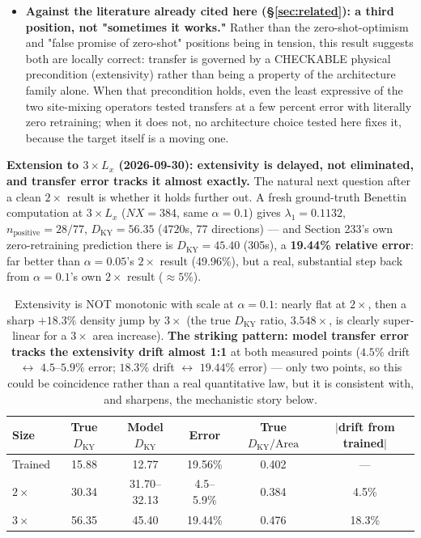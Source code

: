 \documentclass[11pt]{article}
\begin{document}
\begin{itemize}[nosep]
structure) but consistent with the classic flexibility/generalization
trade-off, here measured specifically along the domain-size-extrapolation
axis this document's whole architecture family is built around.
\item \textbf{Against the literature already cited here
(\S\ref{sec:related}): a third position, not "sometimes it works."}
Rather than the zero-shot-optimism and "false promise of zero-shot"
positions being in tension, this result suggests both are locally
correct: transfer is governed by a CHECKABLE physical precondition
(extensivity) rather than being a property of the architecture family
alone. When that precondition holds, even the least expressive of the
two site-mixing operators tested transfers at a few percent error with
literally zero retraining; when it does not, no architecture choice
tested here fixes it, because the target itself is a moving one.
\end{itemize}

\textbf{Extension to $3\times L_x$ (2026-09-30): extensivity is delayed,
not eliminated, and transfer error tracks it almost exactly.} The
natural next question after a clean $2\times$ result is whether it holds
further out. A fresh ground-truth Benettin computation at $3\times L_x$
($NX{=}384$, same $\alpha{=}0.1$) gives $\lambda_1=0.1132$,
$n_{\mathrm{positive}}=28/77$, $D_{\mathrm{KY}}=56.35$ ($4720$s, 77
directions) --- and Section 233's own zero-retraining prediction there is
$D_{\mathrm{KY}}=45.40$ (305s), a \textbf{19.44\% relative error}: far
better than $\alpha=0.05$'s $2\times$ result (49.96\%), but a real,
substantial step back from $\alpha=0.1$'s own $2\times$ result
($\approx5\%$).

\begin{table}[h]
\centering
\begin{tabular}{lccccc}
\toprule
Size & True $D_{\mathrm{KY}}$ & Model $D_{\mathrm{KY}}$ & Error & True $D_{\mathrm{KY}}/\mathrm{Area}$ & $|$drift from trained$|$ \\
\midrule
Trained & 15.88 & 12.77 & 19.56\% & 0.402 & --- \\
$2\times$ & 30.34 & 31.70--32.13 & 4.5--5.9\% & 0.384 & 4.5\% \\
$3\times$ & 56.35 & 45.40 & 19.44\% & 0.476 & 18.3\% \\
\bottomrule
\end{tabular}
\caption{Extensivity is NOT monotonic with scale at $\alpha=0.1$: nearly
flat at $2\times$, then a sharp $+18.3\%$ density jump by $3\times$
(the true $D_{\mathrm{KY}}$ ratio, $3.548\times$, is clearly super-linear
for a $3\times$ area increase). \textbf{The striking pattern: model
transfer error tracks the extensivity drift almost 1:1} at both measured
points ($4.5\%$ drift $\leftrightarrow$ $4.5$--$5.9\%$ error;
$18.3\%$ drift $\leftrightarrow$ $19.44\%$ error) --- only two points,
so this could be coincidence rather than a real quantitative law, but it
is consistent with, and sharpens, the mechanistic story below.}
\label{tab:g2_3x_extension}
\end{table}
\end{document}
